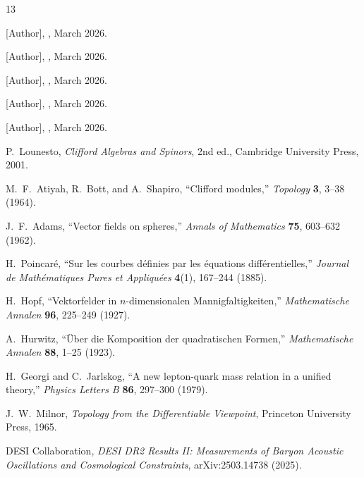 \documentclass[12pt,a4paper]{article}
\begin{document}
\begin{thebibliography}{13}

 {[Author]}, , March 2026.

 {[Author]}, , March 2026.

 {[Author]}, , March 2026.

 {[Author]}, , March 2026.

 {[Author]}, , March 2026.

 P.~Lounesto, \textit{Clifford Algebras and Spinors}, 2nd ed., Cambridge University Press, 2001.

 M.~F.~Atiyah, R.~Bott, and A.~Shapiro, ``Clifford modules,'' \textit{Topology} \textbf{3}, 3--38 (1964).

 J.~F.~Adams, ``Vector fields on spheres,'' \textit{Annals of Mathematics} \textbf{75}, 603--632 (1962).

 H.~Poincar\'e, ``Sur les courbes d\'efinies par les \'equations diff\'erentielles,'' \textit{Journal de Math\'ematiques Pures et Appliqu\'ees} \textbf{4}(1), 167--244 (1885).

 H.~Hopf, ``Vektorfelder in $n$-dimensionalen Mannigfaltigkeiten,'' \textit{Mathematische Annalen} \textbf{96}, 225--249 (1927).

 A.~Hurwitz, ``\"Uber die Komposition der quadratischen Formen,'' \textit{Mathematische Annalen} \textbf{88}, 1--25 (1923).

 H.~Georgi and C.~Jarlskog, ``A new lepton-quark mass relation in a unified theory,'' \textit{Physics Letters B} \textbf{86}, 297--300 (1979).

 J.~W.~Milnor, \textit{Topology from the Differentiable Viewpoint}, Princeton University Press, 1965.

 DESI Collaboration, \textit{DESI DR2 Results II: Measurements of Baryon Acoustic Oscillations and Cosmological Constraints}, arXiv:2503.14738 (2025).

\end{thebibliography}
\end{document}
